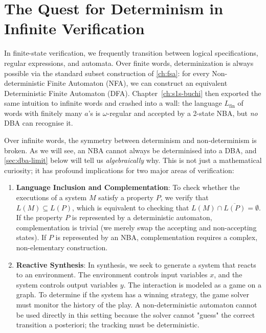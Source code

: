\section{The Quest for Determinism in Infinite Verification}
\label{sec:quest-determinism}

In finite-state verification, we frequently transition between logical specifications, regular expressions, and automata. Over finite words, determinization is always possible via the standard subset construction of \cref{ch:fsa}: for every Non-deterministic Finite Automaton (NFA), we can construct an equivalent Deterministic Finite Automaton (DFA). Chapter~\ref{ch:s1s-buchi} then exported the same intuition to infinite words and crashed into a wall: the language $L_{\mathrm{fin}}$ of words with finitely many $a$'s is $\omega$-regular and accepted by a 2-state NBA, but \emph{no} DBA can recognise it.

Over infinite words, the symmetry between determinism and non-determinism is broken. As we will see, an NBA cannot always be determinised into a DBA, and \cref{sec:dba-limit} below will tell us \emph{algebraically} why. This is not just a mathematical curiosity; it has profound implications for two major areas of verification:
\begin{enumerate}
    \item \textbf{Language Inclusion and Complementation}: To check whether the executions of a system $M$ satisfy a property $P$, we verify that $L(M) \subseteq L(P)$, which is equivalent to checking that $L(M) \cap \overline{L(P)} = \emptyset$. If the property $P$ is represented by a deterministic automaton, complementation is trivial (we merely swap the accepting and non-accepting states). If $P$ is represented by an NBA, complementation requires a complex, non-elementary construction.
    \item \textbf{Reactive Synthesis}: In synthesis, we seek to generate a system that reacts to an environment. The environment controls input variables $x$, and the system controls output variables $y$. The interaction is modeled as a game on a graph. To determine if the system has a winning strategy, the game solver must monitor the history of the play. A non-deterministic automaton cannot be used directly in this setting because the solver cannot "guess" the correct transition a posteriori; the tracking must be deterministic.
\end{enumerate}

